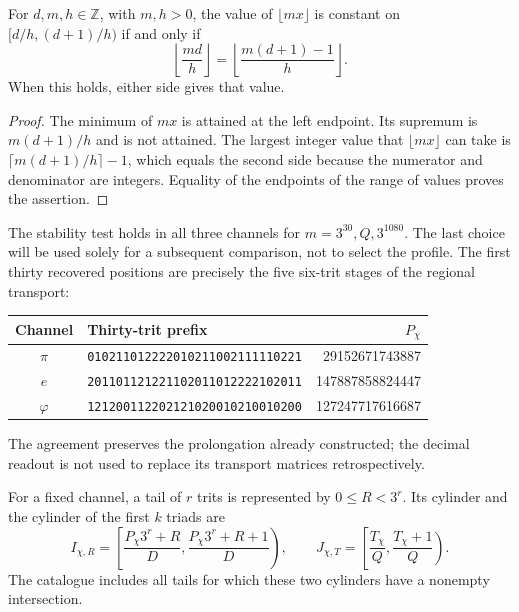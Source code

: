 \begin{lemma}
\label{act21:censo:estabilidad}
For \(d,m,h\in\mathbb Z\), with \(m,h>0\), the value of
\(\lfloor mx\rfloor\) is constant on \([d/h,(d+1)/h)\) if and only if
\begin{equation}
 \left\lfloor\frac{md}{h}\right\rfloor
 =\left\lfloor\frac{m(d+1)-1}{h}\right\rfloor.
 \label{act21:censo:prueba-estabilidad}
\end{equation}
When this holds, either side gives that value.
\end{lemma}
\begin{proof}
The minimum of \(mx\) is attained at the left endpoint. Its supremum
is \(m(d+1)/h\) and is not attained. The largest integer value that
\(\lfloor mx\rfloor\) can take is
\(\lceil m(d+1)/h\rceil-1\), which equals the second side because
the numerator and denominator are integers. Equality of the endpoints
of the range of values proves the assertion.
\end{proof}

The stability test holds in all three channels for
\(m=3^{30},Q,3^{1080}\). The last choice will be used solely
for a subsequent comparison, not to select the profile. The
first thirty recovered positions are precisely the five
six-trit stages of the regional transport:
\begin{center}\small
\begin{tabular}{@{}c l r@{}}\toprule
Channel&Thirty-trit prefix&\(P_\chi\)\\\midrule
\(\pi\)&\texttt{010211012222010211002111110221}&29152671743887\\
\(e\)&\texttt{201101121221102011012222102011}&147887858824447\\
\(\varphi\)&\texttt{121200112202121020010210010200}&127247717616687\\\bottomrule
\end{tabular}
\end{center}
The agreement preserves the prolongation already constructed; the decimal readout
is not used to replace its transport matrices retrospectively.

For a fixed channel, a tail of \(r\) trits is represented by
\(0\leq R<3^r\). Its cylinder and the cylinder of the first \(k\)
triads are
\begin{equation}
 I_{\chi,R}=\left[\frac{P_\chi3^r+R}{D},
                       \frac{P_\chi3^r+R+1}{D}\right),\qquad
 J_{\chi,T}=\left[\frac{T_\chi}{Q},\frac{T_\chi+1}{Q}\right).
 \label{act21:censo:dos-cilindros}
\end{equation}
The catalogue includes all tails for which these two cylinders
have a nonempty intersection.

